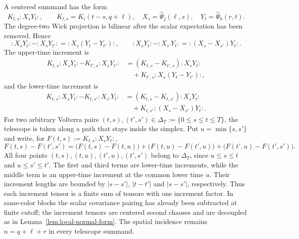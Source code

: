 \documentclass[11pt,reqno]{amsart}
\numberwithin{equation}{section}
\theoremstyle{plain}
\theoremstyle{definition}
\newcommand{\wick}[1]{:#1:}
\begin{document}
A centered summand has the form
\[
        K_{t,s}\wick{X_sY_t},
        \qquad
        K_{t,s}=K_i(t-s,q+\ell),
        \quad
        X_s=\widehat\Psi_j(\ell,s),
        \quad
        Y_t=\widehat\Psi_k(r,t).
\]
The degree-two Wick projection is bilinear after the scalar expectation has been removed.  Hence
\[
        \wick{X_sY_t}-\wick{X_sY_{t'}}
        =\wick{X_s(Y_t-Y_{t'})},
        \qquad
        \wick{X_sY_t}-\wick{X_{s'}Y_t}
        =\wick{(X_s-X_{s'})Y_t} .
\]
The upper-time increment is
\[
\begin{aligned}
        K_{t,s}\wick{X_sY_t}-K_{t',s}\wick{X_sY_{t'}}
        &=(K_{t,s}-K_{t',s})\wick{X_sY_t} \\
        &\quad+K_{t',s}\wick{X_s(Y_t-Y_{t'})},
\end{aligned}
\]
and the lower-time increment is
\[
\begin{aligned}
        K_{t,s}\wick{X_sY_t}-K_{t,s'}\wick{X_{s'}Y_t}
        &=(K_{t,s}-K_{t,s'})\wick{X_sY_t} \\
        &\quad+K_{t,s'}\wick{(X_s-X_{s'})Y_t} .
\end{aligned}
\]
For two arbitrary Volterra pairs \((t,s),(t',s')\in\Delta_T:=\{0\le s\le t\le T\}\), the telescope is taken along a path that stays inside the simplex.  Put \(u=\min\{s,s'\}\) and write, for \(F(t,s):=K_{t,s}\wick{X_sY_t}\),
\[
        F(t,s)-F(t',s')=\bigl(F(t,s)-F(t,u)\bigr)
        +\bigl(F(t,u)-F(t',u)\bigr)
        +\bigl(F(t',u)-F(t',s')\bigr).
\]
All four points \((t,s),(t,u),(t',u),(t',s')\) belong to \(\Delta_T\), since \(u\le s\le t\) and \(u\le s'\le t'\).  The first and third terms are lower-time increments, while the middle term is an upper-time increment at the common lower time \(u\).  Their increment lengths are bounded by \(|s-s'|\), \(|t-t'|\) and \(|s-s'|\), respectively.  Thus each increment tensor is a finite sum of tensors with one increment factor.  In same-color blocks the scalar covariance pairing has already been subtracted at finite cutoff; the increment tensors are centered second chaoses and are decoupled as in Lemma~\ref{lem:local-normal-form}.  The spatial incidence remains \(n=q+\ell+r\) in every telescope summand.
\end{document}
